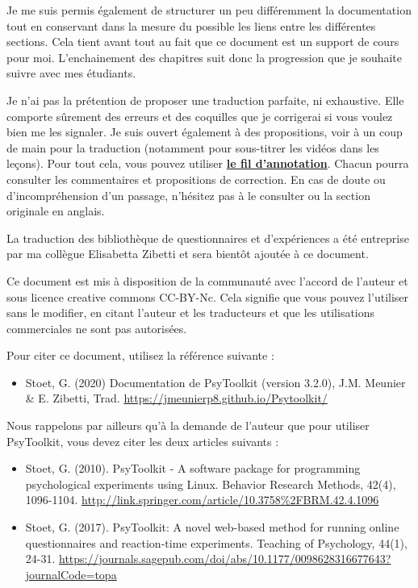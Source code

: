 \documentclass[
]{book}
\providecommand{\tightlist}{%
  \setlength{\itemsep}{0pt}\setlength{\parskip}{0pt}}
\begin{document}
Je me suis permis également de structurer un peu différemment la documentation tout en conservant dans la mesure du possible les liens entre les différentes sections. Cela tient avant tout au fait que ce document est un support de cours pour moi. L'enchainement des chapitres suit donc la progression que je souhaite suivre avec mes étudiants.

Je n'ai pas la prétention de proposer une traduction parfaite, ni exhaustive. Elle comporte sûrement des erreurs et des coquilles que je corrigerai si vous voulez bien me les signaler. Je suis ouvert également à des propositions, voir à un coup de main pour la traduction (notamment pour sous-titrer les vidéos dans les leçons). Pour tout cela, vous pouvez utiliser \href{https://hyp.is/go?url=https\%3A\%2F\%2Fjmeunierp8.github.io\%2FPsytoolkit\%2F\&group=__world__}{\textbf{le fil d'annotation}}. Chacun pourra consulter les commentaires et propositions de correction. En cas de doute ou d'incompréhension d'un passage, n'hésitez pas à le consulter ou la section originale en anglais.

La traduction des bibliothèque de questionnaires et d'expériences a été entreprise par ma collègue Elisabetta Zibetti et sera bientôt ajoutée à ce document.

Ce document est mis à disposition de la communauté avec l'accord de l'auteur et sous licence creative commons CC-BY-Nc. Cela signifie que vous pouvez l'utiliser sans le modifier, en citant l'auteur et les traducteurs et que les utilisations commerciales ne sont pas autorisées.

Pour citer ce document, utilisez la référence suivante :

\begin{itemize}
\tightlist
\item
  Stoet, G. (2020) Documentation de PsyToolkit (version 3.2.0), J.M. Meunier \& E. Zibetti, Trad. \url{https://jmeunierp8.github.io/Psytoolkit/}
\end{itemize}

Nous rappelons par ailleurs qu'à la demande de l'auteur que pour utiliser PsyToolkit, vous devez citer les deux articles suivants :

\begin{itemize}
\item
  Stoet, G. (2010). PsyToolkit - A software package for programming psychological experiments using Linux. Behavior Research Methods, 42(4), 1096-1104. \url{http://link.springer.com/article/10.3758\%2FBRM.42.4.1096}
\item
  Stoet, G. (2017). PsyToolkit: A novel web-based method for running online questionnaires and reaction-time experiments. Teaching of Psychology, 44(1), 24-31. \url{https://journals.sagepub.com/doi/abs/10.1177/0098628316677643?journalCode=topa}
\end{itemize}
\end{document}

